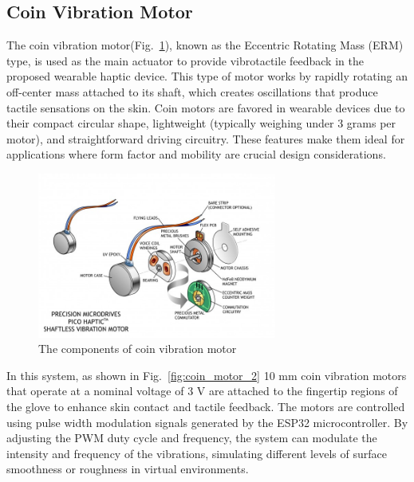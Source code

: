 \newpage
\subsection{Coin Vibration Motor}
The coin vibration motor(Fig.~\ref{fig:coin_motor}), known as the Eccentric Rotating Mass (ERM) type, is used as the main actuator to provide vibrotactile feedback in the proposed wearable haptic device. This type of motor works by rapidly rotating an off-center mass attached to its shaft, which creates oscillations that produce tactile sensations on the skin. Coin motors are favored in wearable devices due to their compact circular shape, lightweight (typically weighing under 3 grams per motor), and straightforward driving circuitry. These features make them ideal for applications where form factor and mobility are crucial design considerations\cite{coin_motor}.

\begin{figure}[H]\centering
	\includegraphics[width=0.7\textwidth]{Pictures/coin_motor.jpg}%
	\caption{The components of coin vibration motor\cite{coin_motor}}\label{fig:coin_motor}%
\end{figure}

In this system, as shown in Fig.~\ref{fig:coin_motor_2} 10 mm coin vibration motors that operate at a nominal voltage of 3 V are attached to the fingertip regions of the glove to enhance skin contact and tactile feedback. The motors are controlled using pulse width modulation signals generated by the ESP32 microcontroller. By adjusting the PWM duty cycle and frequency, the system can modulate the intensity and frequency of the vibrations, simulating different levels of surface smoothness or roughness in virtual environments.

